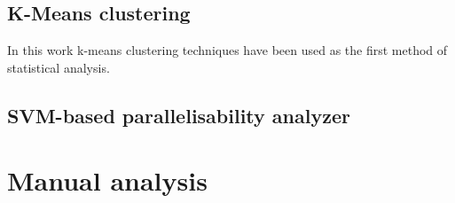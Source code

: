 \subsection{K-Means clustering}

\qquad In this work k-means clustering techniques have been used as the first method of statistical analysis.




\subsection{SVM-based parallelisability analyzer}

\section{Manual analysis}
